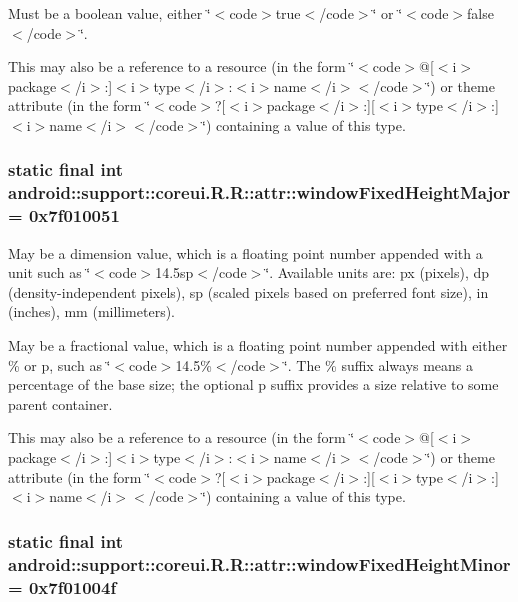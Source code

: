 Must be a boolean value, either \char`\"{}$<$code$>$true$<$/code$>$\char`\"{} or \char`\"{}$<$code$>$false$<$/code$>$\char`\"{}. 

This may also be a reference to a resource (in the form \char`\"{}$<$code$>$@\mbox{[}$<$i$>$package$<$/i$>$:\mbox{]}$<$i$>$type$<$/i$>$:$<$i$>$name$<$/i$>$$<$/code$>$\char`\"{}) or theme attribute (in the form \char`\"{}$<$code$>$?\mbox{[}$<$i$>$package$<$/i$>$:\mbox{]}\mbox{[}$<$i$>$type$<$/i$>$:\mbox{]}$<$i$>$name$<$/i$>$$<$/code$>$\char`\"{}) containing a value of this type. \hypertarget{classandroid_1_1support_1_1coreui_1_1_r_1_1attr_492c1e8a7ff7a75020e3d6b8a7bfd99d}{
\subsubsection[{windowFixedHeightMajor}]{\setlength{\rightskip}{0pt plus 5cm}static final int android::support::coreui.R.R::attr::windowFixedHeightMajor = 0x7f010051}}
\label{classandroid_1_1support_1_1coreui_1_1_r_1_1attr_492c1e8a7ff7a75020e3d6b8a7bfd99d}


May be a dimension value, which is a floating point number appended with a unit such as \char`\"{}$<$code$>$14.5sp$<$/code$>$\char`\"{}. Available units are: px (pixels), dp (density-independent pixels), sp (scaled pixels based on preferred font size), in (inches), mm (millimeters). 

May be a fractional value, which is a floating point number appended with either \% or p, such as \char`\"{}$<$code$>$14.5\%$<$/code$>$\char`\"{}. The \% suffix always means a percentage of the base size; the optional p suffix provides a size relative to some parent container. 

This may also be a reference to a resource (in the form \char`\"{}$<$code$>$@\mbox{[}$<$i$>$package$<$/i$>$:\mbox{]}$<$i$>$type$<$/i$>$:$<$i$>$name$<$/i$>$$<$/code$>$\char`\"{}) or theme attribute (in the form \char`\"{}$<$code$>$?\mbox{[}$<$i$>$package$<$/i$>$:\mbox{]}\mbox{[}$<$i$>$type$<$/i$>$:\mbox{]}$<$i$>$name$<$/i$>$$<$/code$>$\char`\"{}) containing a value of this type. \hypertarget{classandroid_1_1support_1_1coreui_1_1_r_1_1attr_8f5b63549e03a6092fa7727c35b0ba0e}{
\subsubsection[{windowFixedHeightMinor}]{\setlength{\rightskip}{0pt plus 5cm}static final int android::support::coreui.R.R::attr::windowFixedHeightMinor = 0x7f01004f}}
\label{classandroid_1_1support_1_1coreui_1_1_r_1_1attr_8f5b63549e03a6092fa7727c35b0ba0e}


